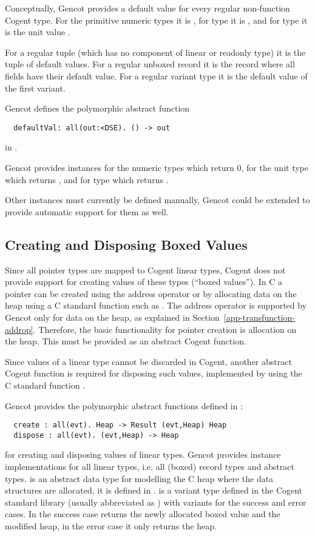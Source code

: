 Conceptually, Gencot provides a default value for every regular non-function Cogent type. For the primitive numeric types it is 
, for type  it is , and for type \code{()} it is the unit value \code{()}.

For a regular tuple (which has no component of linear or readonly type) it is the tuple of default values. For a
regular unboxed record it is the record where all fields have their default value. For a regular variant type it is
the default value of the first variant.

Gencot defines the polymorphic abstract function
\begin{verbatim}
  defaultVal: all(out:<DSE). () -> out
\end{verbatim}
in . 

Gencot provides instances for the numeric types  which return 0, for the unit type \code{()} which returns 
\code{()}, and for type  which returns . 

Other instances must currently be defined manually, Gencot could be extended to provide automatic support for them as well.

\subsection{Creating and Disposing Boxed Values}
\label{design-operations-create}

Since all pointer types are mapped to Cogent linear types, Cogent does not provide support for creating values
of these types (``boxed values''). In C a pointer can be created using the address operator \code{\&} or by allocating data on
the heap using a C standard function such as . The address operator is supported by Gencot
only for data on the heap, as explained in Section~\ref{app-transfunction-addrop}. Therefore, the basic functionality
for pointer creation is allocation on the heap. This must be provided as an abstract Cogent function.

Since values of a linear type cannot be discarded in Cogent, another abstract Cogent function is required for
disposing such values, implemented by using the C standard function .

Gencot provides the polymorphic abstract functions defined in :
\begin{verbatim}
  create : all(evt). Heap -> Result (evt,Heap) Heap
  dispose : all(evt). (evt,Heap) -> Heap
\end{verbatim}
for creating and disposing values of linear types. Gencot provides instance implementations for all linear
types, i.e. all (boxed) record types and abstract types.  is an abstract data type for modelling
the C heap where the data structures are allocated, it is defined in .
 is a variant type defined in the Cogent standard library (usually abbreviated as )
with variants for the success and error cases. In the success case  returns the newly allocated 
boxed value and the modified heap, in the error case it only returns the heap.

